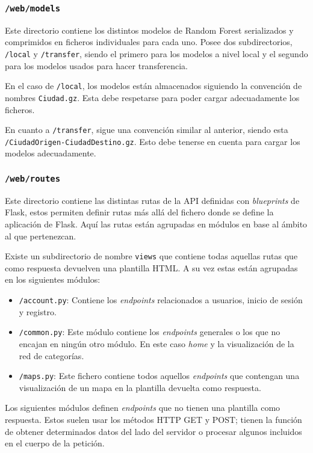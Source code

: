 \subsubsection{\texttt{/web/models}}
Este directorio contiene los distintos modelos de Random Forest serializados y comprimidos en ficheros individuales para cada uno. Posee dos subdirectorios, \texttt{/local} y \texttt{/transfer}, siendo el primero para los modelos a nivel local y el segundo para los modelos usados para hacer transferencia.

En el caso de \texttt{/local}, los modelos están almacenados siguiendo la convención de nombres \texttt{Ciudad.gz}. Esta debe respetarse para poder cargar adecuadamente los ficheros.

En cuanto a \texttt{/transfer}, sigue una convención similar al anterior, siendo esta \texttt{/CiudadOrigen-CiudadDestino.gz}. Esto debe tenerse en cuenta para cargar los modelos adecuadamente.

\subsubsection{\texttt{/web/routes}}
Este directorio contiene las distintas rutas de la API definidas con \textit{blueprints} de Flask, estos permiten definir rutas más allá del fichero donde se define la aplicación de Flask. Aquí las rutas están agrupadas en módulos en base al ámbito al que pertenezcan.

Existe un subdirectorio de nombre \texttt{views} que contiene todas aquellas rutas que como respuesta devuelven una plantilla HTML. A su vez estas están agrupadas en los siguientes módulos:

\begin{itemize}
	\item \texttt{/account.py}: Contiene los \textit{endpoints} relacionados a usuarios, inicio de sesión y registro.
	\item \texttt{/common.py}: Este módulo contiene los \textit{endpoints} generales o los que no encajan en ningún otro módulo. En este caso \textit{home} y la visualización de la red de categorías.
	\item \texttt{/maps.py}: Este fichero contiene todos aquellos \textit{endpoints} que contengan una visualización de un mapa en la plantilla devuelta como respuesta.
\end{itemize}

Los siguientes módulos definen \textit{endpoints} que no tienen una plantilla como respuesta. Estos suelen usar los métodos HTTP GET y POST; tienen la función de obtener determinados datos del lado del servidor o procesar algunos incluidos en el cuerpo de la petición.


